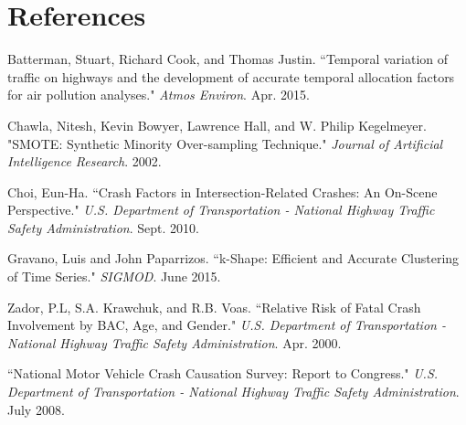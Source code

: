 \documentclass[11pt, oneside,titlepage]{article}   	%
\begin{document}
\section*{References}
\begin{hangparas}{1.27cm}{1}
Batterman, Stuart, Richard Cook, and Thomas Justin. ``Temporal variation of traffic on highways and the development of accurate temporal allocation factors for air pollution analyses." \textit{Atmos Environ}. Apr. 2015.

Chawla, Nitesh, Kevin Bowyer, Lawrence Hall, and W. Philip Kegelmeyer. "SMOTE: Synthetic Minority Over-sampling Technique." \textit{Journal of Artificial Intelligence Research}. 2002.

Choi, Eun-Ha. ``Crash Factors in Intersection-Related Crashes: An On-Scene Perspective." \textit{U.S. Department of Transportation - National Highway Traffic Safety Administration}. Sept. 2010.

Gravano, Luis and John Paparrizos. ``k-Shape: Efficient and Accurate Clustering of Time Series." \textit{SIGMOD}. June 2015.

Zador, P.L, S.A. Krawchuk, and R.B. Voas. ``Relative Risk of Fatal Crash Involvement by BAC, Age, and Gender." \textit{U.S. Department of Transportation - National Highway Traffic Safety Administration}. Apr. 2000.

``National Motor Vehicle Crash Causation Survey: Report to Congress." \textit{U.S. Department of Transportation - National Highway Traffic Safety Administration}. July 2008.


\end{hangparas}
\end{document}
